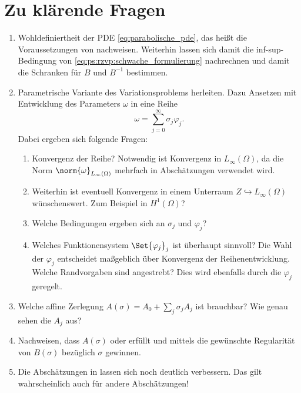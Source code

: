 

\clearpage
\section{Zu klärende Fragen} %
\label{sub:zu_kl_rende_fragen}

\begin{enumerate}
    \item Wohldefiniertheit der PDE \eqref{eq:parabolische_pde}, das heißt die Voraussetzungen von  nachweisen. Weiterhin lassen sich damit die inf-sup-Bedingung von \eqref{eq:ps:rzvp:schwache_formulierung} nachrechnen und damit die Schranken für $B$ und $B^{-1}$ bestimmen.
    \item Parametrische Variante des Variationsproblems herleiten.
    Dazu Ansetzen mit Entwicklung des Parameters $\omega$ in eine Reihe
    \begin{equation}
        \omega = \sum_{j = 0}^{\infty} \sigma_{j} \varphi_{j}.
    \end{equation}
    Dabei ergeben sich folgende Fragen:
    \begin{enumerate}
        \item Konvergenz der Reihe? Notwendig ist Konvergenz in $L_{\infty}(\Omega)$, da die Norm $\norm{\omega}_{L_{\infty}(\Omega)}$ mehrfach in Abschätzungen verwendet wird.
        \item Weiterhin ist eventuell Konvergenz in einem Unterraum $Z \hookrightarrow L_{\infty}(\Omega)$ wünschenswert.
        Zum Beispiel in $H^{1}(\Omega)$?
        \item Welche Bedingungen ergeben sich an $\sigma_{j}$ und $\varphi_{j}$?
        \item Welches Funktionensystem $\Set{ \varphi_{j} }_{j}$ ist überhaupt sinnvoll?
        Die Wahl der $\varphi_{j}$ entscheidet maßgeblich über Konvergenz der Reihenentwicklung.
        Welche Randvorgaben sind angestrebt?
        Dies wird ebenfalls durch die $\varphi_{j}$ geregelt.
    \end{enumerate}
    \item Welche affine Zerlegung $A(\sigma) = A_{0} + \sum_{j} \sigma_{j} A_{j}$ ist brauchbar?
    Wie genau sehen die $A_{j}$ aus?
    \item Nachweisen, dass $A(\sigma)$  oder  erfüllt und mittels  die gewünschte Regularität von $B(\sigma)$ bezüglich $\sigma$ gewinnen.
    \item Die Abschätzungen in  lassen sich noch deutlich verbessern.
    Das gilt wahrscheinlich auch für andere Abschätzungen!
\end{enumerate}

